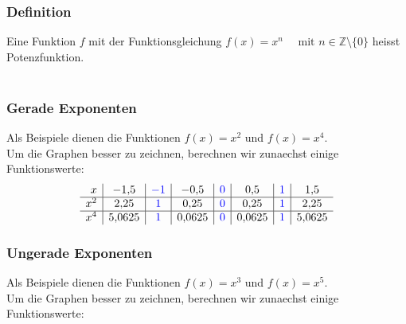 \begin{multicols}{2}
    \subsubsection{Definition}
    \vspace{-4mm}
    Eine Funktion $f$ mit der Funktionsgleichung $f(x) = x^n \quad \text{ mit } n \in \mathbb{Z}\setminus\{0\}$ heisst Potenzfunktion. \\~\\
    \subsubsection{Gerade Exponenten}
    \vspace{-4mm}
    Als Beispiele dienen die Funktionen $f(x) = x^2$ und $f(x) = x^4$. \\
    Um die Graphen besser zu zeichnen, berechnen wir zunaechst einige Funktionswerte:
    \[\begin{array}{r|c|c|c|c|c|c|c} x & -1{,}5 & {\color{blue}-1} & -0{,}5 & {\color{blue}0} & 0{,}5 & {\color{blue}1} & 1{,}5 \\ \hline x^2 & 2{,}25 & {\color{blue}1} & 0{,}25 & {\color{blue}0} & 0{,}25 & {\color{blue}1} & 2{,}25 \\ \hline x^4 & 5{,}0625 & {\color{blue}1} & 0{,}0625 & {\color{blue}0} & 0{,}0625 & {\color{blue}1} & 5{,}0625 \end{array}\]
    \subsubsection{Ungerade Exponenten}
    \vspace{-4mm}
    Als Beispiele dienen die Funktionen $f(x) = x^3$ und $f(x) = x^5$. \\
    Um die Graphen besser zu zeichnen, berechnen wir zunaechst einige Funktionswerte:  \


\end{multicols}
